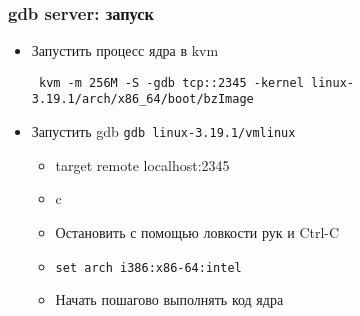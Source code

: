 \begin{frame}
  \frametitle{gdb server: запуск}
\begin{itemize}
    \item Запустить процесс ядра в kvm

      \texttt{ kvm -m 256M -S -gdb tcp::2345 -kernel linux-3.19.1/arch/x86\_64/boot/bzImage }
    \item Запустить gdb \texttt{gdb linux-3.19.1/vmlinux}
    \begin{itemize}
      \item target remote localhost:2345
      \item c
      \item Остановить с помощью ловкости рук и Ctrl-C
      \item \texttt{set arch i386:x86-64:intel}
      \item Начать пошагово выполнять код ядра
    \end{itemize}
\end{itemize}
\end{frame}
  



